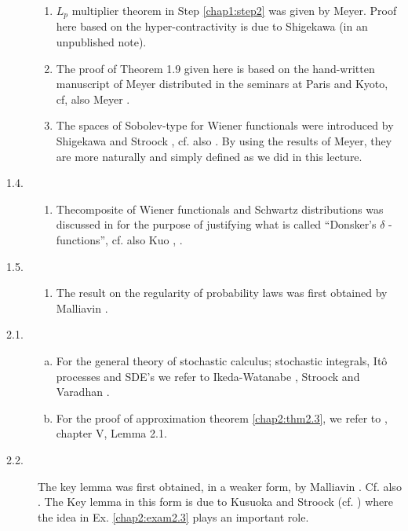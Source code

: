 \begin{description}
\begin{enumerate}
\item $L_p$ multiplier theorem in Step \ref{chap1:step2} was given by
  Meyer. Proof 
  here based on the hyper-contractivity is due to Shigekawa (in an
  unpublished note). 

\item The proof of Theorem 1.9 given here is based on the
  hand-written manuscript of Meyer distributed in the seminars at
  Paris and Kyoto, cf, also Meyer \cite{key10}. 

\item The spaces of Sobolev-type for Wiener functionals were
  introduced by Shigekawa \cite{key13} and Stroock \cite{key16}, cf. also
  \cite{key3}. By using the results of Meyer, they are more naturally and
  simply defined as we did in this lecture. 
\end{enumerate}

\item[1.4.] \begin{enumerate}
\renewcommand{\theenumi}{\alph{enumi}}
\renewcommand{\labelenumi}{(\theenumi)}
\item The\pageoriginale composite of Wiener functionals and Schwartz
  distributions was discussed in \cite{key21} for the purpose of justifying
  what is called  ``Donsker's $\delta$ - functions'', cf. also Kuo
  \cite{key5}, \cite{key6}.   
\end{enumerate}

\item[1.5.]
\begin{enumerate}
\renewcommand{\theenumi}{\alph{enumi}}
\renewcommand{\labelenumi}{(\theenumi)}
\item The result on the regularity of probability laws was first
  obtained by Malliavin \cite{key8}. 
\end{enumerate}
\end{description}

\medskip
{}

\begin{description}
\item[2.1.]
\begin{enumerate}[(a)]
\renewcommand{\theenumi}{\alph{enumi}}
\renewcommand{\labelenumi}{(\theenumi)}
\item For the general theory of stochastic calculus; stochastic
  integrals, It\^{o} processes and SDE's we refer to
  Ikeda-Watanabe \cite{key3}, Stroock \cite{key19} and Varadhan
  \cite{key20}.   

\item For the proof of approximation theorem \ref{chap2:thm2.3}, we
  refer to \cite{key3},  chapter V, Lemma 2.1.  
\end{enumerate}

\item[2.2.]
The key lemma was first obtained, in a weaker form, by Malliavin
  \cite{key8}. Cf. also \cite{key3}. The Key lemma in this form is due
  to Kusuoka and Stroock (cf. \cite{key18}) where the idea in
  Ex. \ref{chap2:exam2.3} plays an important role.  
\end{description}

